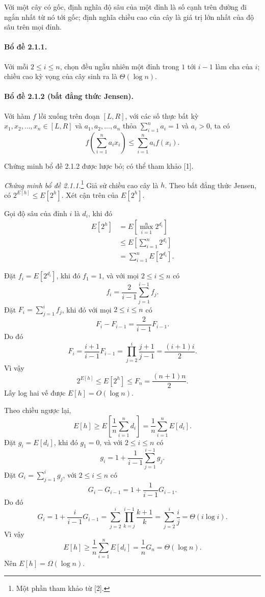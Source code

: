 \documentclass[11pt]{article}
\begin{document}
Với một cây có gốc, định nghĩa độ sâu của một đỉnh là số cạnh trên đường đi
ngắn nhất từ nó tới gốc; định nghĩa chiều cao của cây là giá trị lớn nhất của
độ sâu trên mọi đỉnh.

\paragraph{Bổ đề 2.1.1.}
Với mỗi $2\le i\le n$, chọn đều ngẫu nhiên một đỉnh trong $1$ tới $i-1$ làm cha
của $i$; chiều cao kỳ vọng của cây sinh ra là $\Theta(\log n)$.

\paragraph{Bổ đề 2.1.2 (bất đẳng thức Jensen).}
Với hàm $f$ lồi xuống trên đoạn $[L,R]$, với các số thực bất kỳ
$x_1,x_2,\ldots,x_n\in[L,R]$ và $a_1,a_2,\ldots,a_n$ thỏa
$\sum_{i=1}^n a_i=1$ và $a_i>0$, ta có
\[
f\left(\sum_{i=1}^n a_i x_i\right)\le \sum_{i=1}^n a_i f(x_i).
\]

Chứng minh bổ đề 2.1.2 được lược bỏ; có thể tham khảo [1].

\emph{Chứng minh bổ đề 2.1.1.}\footnote{Một phần tham khảo từ [2].}
Giả sử chiều cao cây là $h$. Theo bất đẳng thức Jensen, có
$2^{E[h]}\le E[2^h]$. Xét cận trên của $E[2^h]$.

Gọi độ sâu của đỉnh $i$ là $d_i$, khi đó
\[
\begin{aligned}
E[2^h]
&= E\left[\max_{i=1}^n 2^{d_i}\right]\\
&\le E\left[\sum_{i=1}^n 2^{d_i}\right]\\
&= \sum_{i=1}^n E[2^{d_i}].
\end{aligned}
\]

Đặt $f_i=E[2^{d_i}]$, khi đó $f_1=1$, và với mọi $2\le i\le n$ có
\[
f_i=\frac{2}{i-1}\sum_{j=1}^{i-1} f_j.
\]
Đặt $F_i=\sum_{j=1}^i f_j$, khi đó với mọi $2\le i\le n$ có
\[
F_i-F_{i-1}=\frac{2}{i-1}F_{i-1}.
\]
Do đó
\[
F_i=\frac{i+1}{i-1}F_{i-1}
=\prod_{j=2}^i \frac{j+1}{j-1}
=\frac{(i+1)i}{2}.
\]
Vì vậy
\[
2^{E[h]}\le E[2^h]\le F_n=\frac{(n+1)n}{2}.
\]
Lấy log hai vế được $E[h]=O(\log n)$.

Theo chiều ngược lại,
\[
E[h]\ge E\left[\frac1n\sum_{i=1}^n d_i\right]
=\frac1n\sum_{i=1}^n E[d_i].
\]
Đặt $g_i=E[d_i]$, khi đó $g_1=0$, và với $2\le i\le n$ có
\[
g_i=1+\frac{1}{i-1}\sum_{j=1}^{i-1}g_j.
\]
Đặt $G_i=\sum_{j=1}^i g_j$, với $2\le i\le n$ có
\[
G_i-G_{i-1}=1+\frac{1}{i-1}G_{i-1}.
\]
Do đó
\[
G_i=1+\frac{i}{i-1}G_{i-1}
=\sum_{j=2}^i\prod_{k=j}^{i-1}\frac{k+1}{k}
=\sum_{j=2}^i \frac{i}{j}
=\Theta(i\log i).
\]
Vì vậy
\[
E[h]\ge \frac1n\sum_{i=1}^n E[d_i]=\frac1nG_n=\Theta(\log n).
\]
Nên $E[h]=\Omega(\log n)$.
\end{document}
